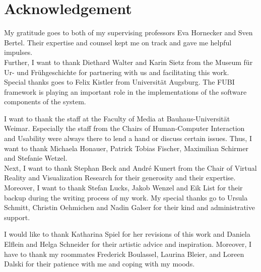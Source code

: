 \chapter*{Acknowledgement}

My gratitude goes to both of my supervising professors Eva Hornecker and Sven Bertel. Their expertise and counsel kept me on track and gave me helpful impulses. 
\\
Further, I want to thank Diethard Walter and Karin Sietz from the Museum für Ur- und Frühgeschichte for partnering with us and facilitating this work. 
\\
Special thanks goes to Felix Kistler from Universität Augsburg. The FUBI framework is playing an important role in the implementations of the software components of the system. 

I want to thank the staff at the Faculty of Media at Bauhaus-Universität Weimar. Especially the staff from the Chairs of Human-Computer Interaction and Usability were always there to lend a hand or discuss certain issues. Thus, I want to thank Michaela Honauer, Patrick Tobias Fischer, Maximilian Schirmer and Stefanie Wetzel.
\\
Next, I want to thank Stephan Beck and André Kunert from the Chair of Virtual Reality and Visualization Research for their generosity and their expertise. Moreover, I want to thank Stefan Lucks, Jakob Wenzel and Eik List for their backup during the writing process of my work. My special thanks go to Ursula Schmitt, Christin Oehmichen and Nadin Galser for their kind and administrative support.

I would like to thank Katharina Spiel for her revisions of this work and Daniela Elflein and Helga Schneider for their artistic advice and inspiration. Moreover, I have to thank my roommates Frederick Boulassel, Laurina Bleier, and Loreen Dalski for their patience with me and coping with my moods.



